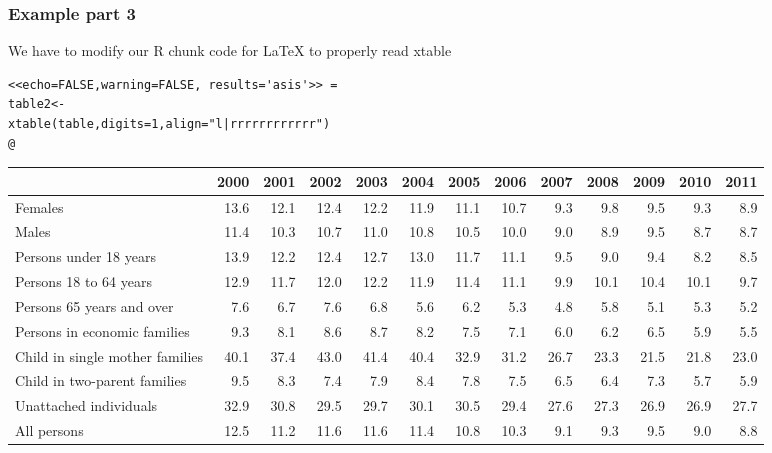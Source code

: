 \documentclass[nogin]{beamer}\usepackage[]{graphicx}\usepackage[]{color}
\begin{document}
\begin{frame}[fragile]
\frametitle{Example part 3}
We have to modify our R chunk code for LaTeX to properly read xtable
\begin{verbatim}
<<echo=FALSE,warning=FALSE, results='asis'>> =
table2<-
xtable(table,digits=1,align="l|rrrrrrrrrrrr")
@
\end{verbatim}
\begin{table}[ht]
\centering
\begin{tabular}{l|rrrrrrrrrrrr}
  \hline
 & 2000 & 2001 & 2002 & 2003 & 2004 & 2005 & 2006 & 2007 & 2008 & 2009 & 2010 & 2011 \\ 
  \hline
Females & 13.6 & 12.1 & 12.4 & 12.2 & 11.9 & 11.1 & 10.7 & 9.3 & 9.8 & 9.5 & 9.3 & 8.9 \\ 
  Males & 11.4 & 10.3 & 10.7 & 11.0 & 10.8 & 10.5 & 10.0 & 9.0 & 8.9 & 9.5 & 8.7 & 8.7 \\ 
  Persons under 18 years & 13.9 & 12.2 & 12.4 & 12.7 & 13.0 & 11.7 & 11.1 & 9.5 & 9.0 & 9.4 & 8.2 & 8.5 \\ 
  Persons 18 to 64 years & 12.9 & 11.7 & 12.0 & 12.2 & 11.9 & 11.4 & 11.1 & 9.9 & 10.1 & 10.4 & 10.1 & 9.7 \\ 
  Persons 65 years and over & 7.6 & 6.7 & 7.6 & 6.8 & 5.6 & 6.2 & 5.3 & 4.8 & 5.8 & 5.1 & 5.3 & 5.2 \\ 
  Persons in economic families & 9.3 & 8.1 & 8.6 & 8.7 & 8.2 & 7.5 & 7.1 & 6.0 & 6.2 & 6.5 & 5.9 & 5.5 \\ 
  Child in single mother families & 40.1 & 37.4 & 43.0 & 41.4 & 40.4 & 32.9 & 31.2 & 26.7 & 23.3 & 21.5 & 21.8 & 23.0 \\ 
  Child in two-parent families & 9.5 & 8.3 & 7.4 & 7.9 & 8.4 & 7.8 & 7.5 & 6.5 & 6.4 & 7.3 & 5.7 & 5.9 \\ 
  Unattached individuals & 32.9 & 30.8 & 29.5 & 29.7 & 30.1 & 30.5 & 29.4 & 27.6 & 27.3 & 26.9 & 26.9 & 27.7 \\ 
  All persons & 12.5 & 11.2 & 11.6 & 11.6 & 11.4 & 10.8 & 10.3 & 9.1 & 9.3 & 9.5 & 9.0 & 8.8 \\ 
   \hline
\end{tabular}
\end{table}


\end{frame}
\end{document}
